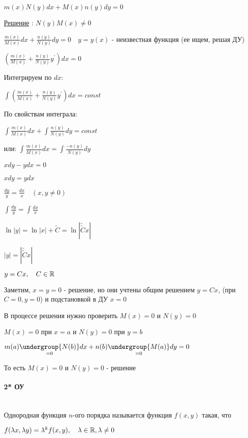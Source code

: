 \documentclass[12pt]{article}
\begin{document}
    \Def $m(x)N(y)dx + M(x)n(y)dy = 0$

    \underline{Решение} : $N(y)M(x) \neq 0$

    $\frac{m(x)}{M(x)}dx + \frac{n(y)}{N(y)}dy = 0 \quad y = y(x)$ - неизвестная функция (ее ищем, решая ДУ)

    $(\frac{m(x)}{M(x)} + \frac{n(y)}{N(y)}y^\prime)dx = 0$

    Интегрируем по $dx$:

    $\int \left(\frac{m(x)}{M(x)} + \frac{n(y)}{N(y)}y^\prime\right)dx = const$

    По свойствам интеграла:

    $\int \frac{m(x)}{M(x)}dx + \int\frac{n(y)}{N(y)}dy = const$

    или: $\int \frac{m(x)}{M(x)}dx = \int\frac{-n(y)}{N(y)}dy$

    \Ex $xdy - ydx = 0$

    $xdy = ydx$

    $\frac{dy}{y} = \frac{dx}{x} \quad (x, y \neq 0)$

    $\int \frac{dy}{y} = \int \frac{dx}{x}$

    $\ln|y| = \ln|x| + \tilde{C} = \ln|\tilde{\tilde{C}}x|$

    $|y| = |\tilde{\tilde{C}}x|$

    $y = Cx, \quad C \in \mathbb{R}$

    Заметим, $x = y = 0$ - решение, но они учтены общим решением $y = Cx$, (при $C = 0, y = 0$) и подстановкой в ДУ $x = 0$

    \Nota В процессе решения нужно проверить $M(x) = 0$ и $N(y) = 0$

    $M(x) = 0$ при $x = a$ и $N(y) = 0$ при $y = b$

    $m(a)\underset{=0}{\undergroup{N(b)}}dx + n(b)\underset{=0}{\undergroup{M(a)}}dy = 0$

    То есть $M(x) = 0$ и $N(y) = 0$ - решение

    \mediumvspace

    \hypertarget{homogeneousequation}{}

    \paragraph{2* ОУ}\mbox{}\\

     Однородная функция $n$-ого порядка называется функция $f(x, y)$ такая, что

    $f(\lambda x, \lambda y) = \lambda^k f(x, y), \quad \lambda \in \mathbb{R}, \lambda \neq 0$
\end{document}

